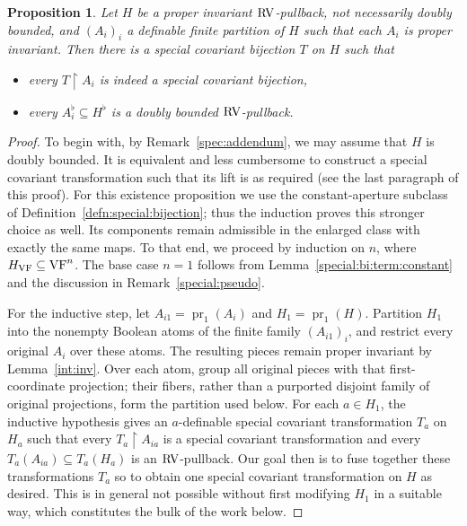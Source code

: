 \documentclass[12pt]{amsart}
\theoremstyle{plain}
\newtheorem{prop}[thm]{Proposition}
\theoremstyle{definition}
\theoremstyle{remark}
\numberwithin{equation}{section}
\theoremstyle{plain}
\newcommand{\VF}{\textup{VF}}
\newcommand{\RV}{\textup{RV}}
\DeclareMathOperator{\pr}{pr}
\newcommand{\0}{\emptyset}
\newcommand{\rest}{\upharpoonright}
\newcommand{\sub}{\subseteq}
\DeclareMathOperator{\rv}{rv}
\begin{document}
\begin{prop}\label{simplex:with:hole:rvproduct}
Let $H$ be a proper invariant $\RV$-pullback, not necessarily doubly bounded, and $(A_i)_i$ a definable finite partition of $H$ such that each $A_i$ is proper invariant. Then there is a special covariant bijection $T$ on $H$ such that
\begin{itemize}
  \item every $T \rest A_i$ is indeed a special covariant bijection,
  \item every $A_i^{\flat} \sub H^{\flat}$  is a doubly bounded $\RV$-pullback.
\end{itemize}
\end{prop}
\begin{proof}
To begin with, by Remark~\ref{spec:addendum}, we may assume that $H$ is doubly bounded. It is equivalent and less cumbersome to construct a special covariant transformation such that its lift is as required (see the last paragraph of this proof). For this existence proposition we use the constant-aperture subclass of Definition~\ref{defn:special:bijection}; thus the induction proves this stronger choice as well. Its components remain admissible in the enlarged class with exactly the same maps. To that end, we proceed by induction on $n$, where $H_{\VF} \sub \VF^n$. The base case $n=1$ follows from Lemma~\ref{special:bi:term:constant} and the discussion in Remark~\ref{special:pseudo}.


For the inductive step, let $A_{i1} = \pr_1(A_i)$ and $H_1 = \pr_1(H)$. Partition $H_1$ into the nonempty Boolean atoms of the finite family $(A_{i1})_i$, and restrict every original $A_i$ over these atoms. The resulting pieces remain proper invariant by Lemma~\ref{int:inv}. Over each atom, group all original pieces with that first-coordinate projection; their fibers, rather than a purported disjoint family of original projections, form the partition used below. For each $a \in H_1$, the inductive hypothesis gives an $a$-definable special covariant transformation $T_a$ on $H_a$ such that every $T_a \rest A_{ia}$ is a special covariant transformation and every $T_a(A_{ia}) \sub T_a(H_a)$ is an $\RV$-pullback. Our goal then is to fuse together these transformations $T_a$ so to obtain one special covariant transformation on $H$ as desired. This is in general not possible without first modifying $H_1$ in a suitable way, which constitutes the bulk of the work below.



\end{proof}
\end{document}
